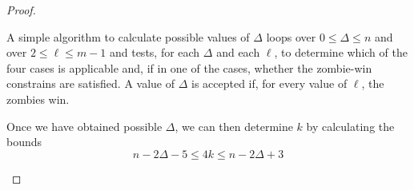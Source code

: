 \begin{proof}
\begin{description}
A simple algorithm to calculate possible values of $\Delta$ loops
over $0 \leq \Delta \leq n$ and over $2 \leq \ell \leq m-1$ and tests,
for each $\Delta$ and each $\ell$, to determine which of the four cases is
applicable and, if in one of the cases, whether the zombie-win constrains are
satisfied. A value of $\Delta$ is accepted if, for every value of $\ell$, the
zombies win.

Once we have obtained possible $\Delta$, we can then determine $k$ by
calculating the bounds
\[ n - 2\Delta -5 \leq 4k \leq n-2\Delta +3 \]

\end{description}
\end{proof}
